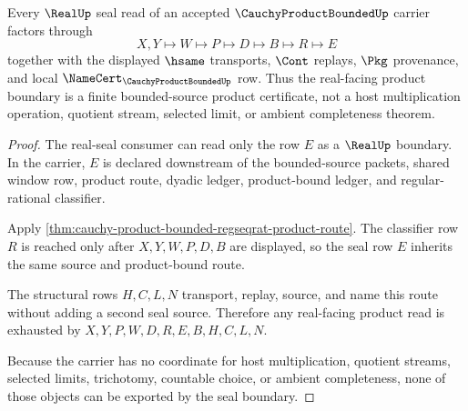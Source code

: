 \begin{theorem}
\label{thm:cauchy-product-bounded-real-seal-boundary}
Every $\RealUp$ seal read of an accepted $\CauchyProductBoundedUp$ carrier factors through
$$
X,Y\longmapsto W\longmapsto P\longmapsto D\longmapsto B\longmapsto R\longmapsto E
$$
together with the displayed $\hsame$ transports, $\Cont$ replays, $\Pkg$ provenance, and local $\NameCert_{\CauchyProductBoundedUp}$ row. Thus the real-facing product boundary is a finite bounded-source product certificate, not a host multiplication operation, quotient stream, selected limit, or ambient completeness theorem.
\end{theorem}
\begin{proof}
The real-seal consumer can read only the row $E$ as a $\RealUp$ boundary. In the carrier, $E$ is declared downstream of the bounded-source packets, shared window row, product route, dyadic ledger, product-bound ledger, and regular-rational classifier.

Apply \autoref{thm:cauchy-product-bounded-regseqrat-product-route}. The classifier row $R$ is reached only after $X,Y,W,P,D,B$ are displayed, so the seal row $E$ inherits the same source and product-bound route.

The structural rows $H,C,L,N$ transport, replay, source, and name this route without adding a second seal source. Therefore any real-facing product read is exhausted by $X,Y,P,W,D,R,E,B,H,C,L,N$.

Because the carrier has no coordinate for host multiplication, quotient streams, selected limits, trichotomy, countable choice, or ambient completeness, none of those objects can be exported by the seal boundary.
\end{proof}



